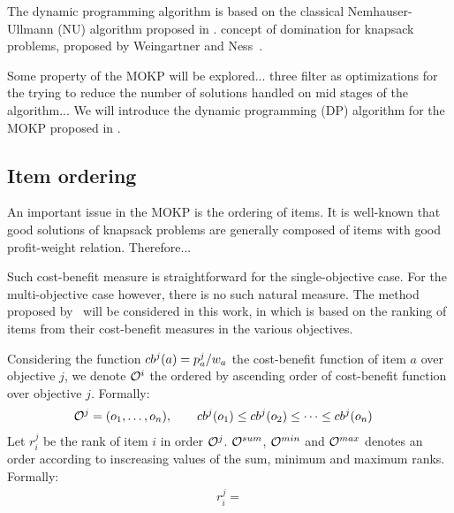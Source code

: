 

The dynamic programming algorithm is based on the classical Nemhauser-Ullmann (NU) algorithm proposed
in \cite{nemhauser1969discrete}.
concept of domination for knapsack problems,
proposed by Weingartner and Ness~\cite{weingartner1967methods}.

Some property of the MOKP will be explored...
three filter as optimizations for the trying
to reduce the number of solutions
handled on mid stages of the algorithm...
We will introduce the dynamic programming (DP) algorithm for the MOKP proposed in \cite{bazgan2009}.


\subsection{Item ordering}

An important issue in the MOKP is the ordering of items.
It is well-known that good solutions of knapsack problems
are generally composed of items with good profit-weight relation.
Therefore...

Such cost-benefit measure is straightforward for the single-objective case. For the multi-objective case however, there is no such natural measure.
The method proposed by~\cite{bazgan2009} will be considered in this work,
in which is based on the ranking of items from their cost-benefit measures
in the various objectives.

Considering the function $cb^{j}(a) = {p^j_a}/{w_a}$ the cost-benefit function of item $a$ over objective $j$, we denote $\mathcal{O}^i$ the
ordered by ascending order of cost-benefit function over objective $j$.
Formally:
\begin{align*}
  \mathcal{O}^j &= (o_1, \ldots, o_n) , \qquad cb^{j}(o_{1}) \leq cb^{j}(o_{2}) \leq \cdots \leq cb^{j}(o_{n})
\end{align*}
Let $r^j_i$ be the rank of item $i$ in order $\mathcal{O}^j$.
$\mathcal{O}^{sum}$, $\mathcal{O}^{min}$ and $\mathcal{O}^{max}$ denotes an order according to inscreasing values of the sum, minimum and maximum ranks.
Formally:
\begin{align*}
  r^j_i =
\end{align*}

